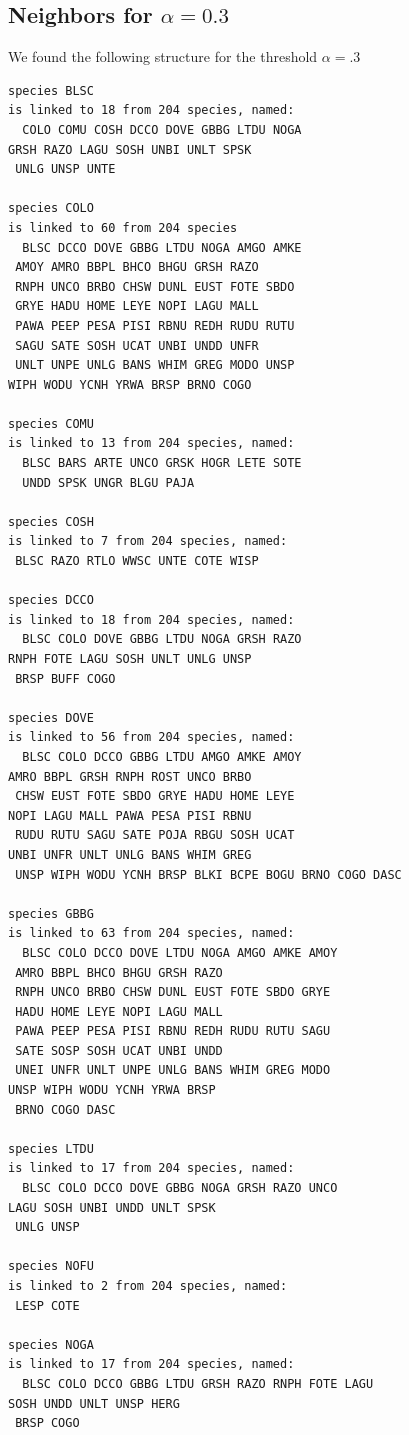 \documentclass{statsoc}
\begin{document}
\subsection*{Neighbors for $\alpha=0.3$}

We found the following structure for the threshold $\alpha=.3$
\begin{lstlisting}
species BLSC
is linked to 18 from 204 species, named:
  COLO COMU COSH DCCO DOVE GBBG LTDU NOGA 
GRSH RAZO LAGU SOSH UNBI UNLT SPSK
 UNLG UNSP UNTE

species COLO
is linked to 60 from 204 species
  BLSC DCCO DOVE GBBG LTDU NOGA AMGO AMKE
 AMOY AMRO BBPL BHCO BHGU GRSH RAZO
 RNPH UNCO BRBO CHSW DUNL EUST FOTE SBDO
 GRYE HADU HOME LEYE NOPI LAGU MALL
 PAWA PEEP PESA PISI RBNU REDH RUDU RUTU
 SAGU SATE SOSH UCAT UNBI UNDD UNFR
 UNLT UNPE UNLG BANS WHIM GREG MODO UNSP 
WIPH WODU YCNH YRWA BRSP BRNO COGO

species COMU
is linked to 13 from 204 species, named:
  BLSC BARS ARTE UNCO GRSK HOGR LETE SOTE  
  UNDD SPSK UNGR BLGU PAJA

species COSH
is linked to 7 from 204 species, named:
 BLSC RAZO RTLO WWSC UNTE COTE WISP

species DCCO
is linked to 18 from 204 species, named:
  BLSC COLO DOVE GBBG LTDU NOGA GRSH RAZO 
RNPH FOTE LAGU SOSH UNLT UNLG UNSP
 BRSP BUFF COGO

species DOVE
is linked to 56 from 204 species, named:
  BLSC COLO DCCO GBBG LTDU AMGO AMKE AMOY 
AMRO BBPL GRSH RNPH ROST UNCO BRBO
 CHSW EUST FOTE SBDO GRYE HADU HOME LEYE 
NOPI LAGU MALL PAWA PESA PISI RBNU
 RUDU RUTU SAGU SATE POJA RBGU SOSH UCAT 
UNBI UNFR UNLT UNLG BANS WHIM GREG
 UNSP WIPH WODU YCNH BRSP BLKI BCPE BOGU BRNO COGO DASC

species GBBG
is linked to 63 from 204 species, named:
  BLSC COLO DCCO DOVE LTDU NOGA AMGO AMKE AMOY
 AMRO BBPL BHCO BHGU GRSH RAZO
 RNPH UNCO BRBO CHSW DUNL EUST FOTE SBDO GRYE
 HADU HOME LEYE NOPI LAGU MALL
 PAWA PEEP PESA PISI RBNU REDH RUDU RUTU SAGU
 SATE SOSP SOSH UCAT UNBI UNDD
 UNEI UNFR UNLT UNPE UNLG BANS WHIM GREG MODO 
UNSP WIPH WODU YCNH YRWA BRSP
 BRNO COGO DASC

species LTDU
is linked to 17 from 204 species, named:
  BLSC COLO DCCO DOVE GBBG NOGA GRSH RAZO UNCO 
LAGU SOSH UNBI UNDD UNLT SPSK
 UNLG UNSP

species NOFU
is linked to 2 from 204 species, named:
 LESP COTE

species NOGA
is linked to 17 from 204 species, named:
  BLSC COLO DCCO GBBG LTDU GRSH RAZO RNPH FOTE LAGU 
SOSH UNDD UNLT UNSP HERG
 BRSP COGO


\end{lstlisting}
\end{document}
